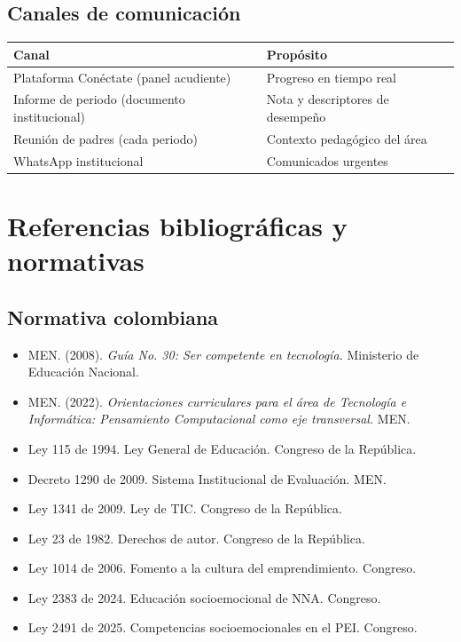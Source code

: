 \documentclass[12pt, a4paper]{article}
\begin{document}
\subsection{Canales de comunicación}

\begin{center}
\begin{tabular}{|L{5cm}|L{9cm}|}
\hline
{}
\color{white}\textbf{Canal} &
\color{white}\textbf{Propósito} \\
\hline
Plataforma Conéctate (panel acudiente) &
Progreso en tiempo real \\
\hline
Informe de periodo (documento institucional) &
Nota y descriptores de desempeño \\
\hline
Reunión de padres (cada periodo) &
Contexto pedagógico del área \\
\hline
WhatsApp institucional &
Comunicados urgentes \\
\hline
\end{tabular}
\end{center}

\section{Referencias bibliográficas y normativas}

\subsection{Normativa colombiana}

\begin{itemize}
  \item MEN. (2008). \textit{Guía No. 30: Ser competente en tecnología.}
    Ministerio de Educación Nacional.
  \item MEN. (2022). \textit{Orientaciones curriculares para el área de Tecnología
    e Informática: Pensamiento Computacional como eje transversal.} MEN.
  \item Ley 115 de 1994. Ley General de Educación. Congreso de la República.
  \item Decreto 1290 de 2009. Sistema Institucional de Evaluación. MEN.
  \item Ley 1341 de 2009. Ley de TIC. Congreso de la República.
  \item Ley 23 de 1982. Derechos de autor. Congreso de la República.
  \item Ley 1014 de 2006. Fomento a la cultura del emprendimiento. Congreso.
  \item Ley 2383 de 2024. Educación socioemocional de NNA. Congreso.
  \item Ley 2491 de 2025. Competencias socioemocionales en el PEI. Congreso.
\end{itemize}
\end{document}
